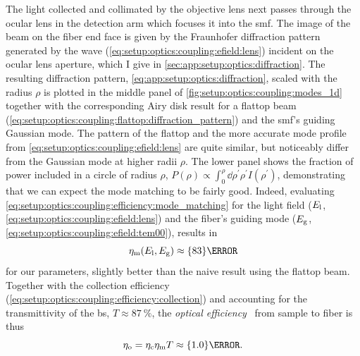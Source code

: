 The light collected and collimated by the objective lens next passes through the ocular lens in the detection arm which focuses it into the \gls{smf}.
The image of the beam on the fiber end face is given by the Fraunhofer diffraction pattern generated by the wave (\cref{eq:setup:optics:coupling:efield:lens}) incident on the ocular lens aperture, which I give in \cref{sec:app:setup:optics:diffraction}.
The resulting diffraction pattern, \cref{eq:app:setup:optics:diffraction}, scaled with the radius $\rho$ is plotted in the middle panel of \cref{fig:setup:optics:coupling:modes_1d} together with the corresponding Airy disk result for a flattop beam (\cref{eq:setup:optics:coupling:flattop:diffraction_pattern}) and the \gls{smf}'s guiding Gaussian mode.
The pattern of the flattop and the more accurate mode profile from \cref{eq:setup:optics:coupling:efield:lens} are quite similar, but noticeably differ from the Gaussian mode at higher radii $\rho$.
The lower panel shows the fraction of power included in a circle of radius $\rho$, $P(\rho)\propto \int_0^{\rho}\dd{\rho^{\prime}} \rho^{\prime} I(\rho^{\prime})$, demonstrating that we can expect the mode matching to be fairly good.
Indeed, evaluating \cref{eq:setup:optics:coupling:efficiency:mode_matching} for the light field ($E_{\mathrm{l}}$, \cref{eq:setup:optics:coupling:efield:lens}) and the fiber's guiding mode ($E_{\mathrm{g}}$, \cref{eq:setup:optics:coupling:efield:tem00}), results in
\begin{equation}\label{eq:setup:optics:coupling:efficiency:mode_matching:eval}
    \eta_{\mr{m}}(E_{\mr{l}}, E_{\mr{g}})\approx\qty{83}{\percent}
\end{equation}
for our parameters, slightly better than the naive result using the flattop beam.
Together with the collection efficiency (\cref{eq:setup:optics:coupling:efficiency:collection}) and accounting for the transmittivity of the \gls{bs}, $T\approx\qty{87}{\percent}$,
the \emph{optical efficiency}~\cite{Sze2007} from sample to fiber is thus
\begin{equation}\label{eq:setup:optics:coupling:efficiency:optical}
    \eta_{\mr{o}} = \eta_{\mr{c}}\eta_{\mr{m}} T \approx\qty{1.0}{\percent}.
\end{equation}

